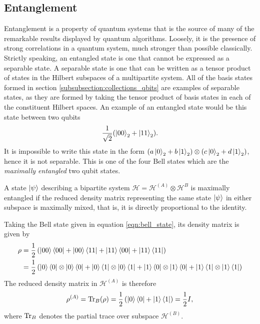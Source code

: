 \subsection{Entanglement}
Entanglement is a property of quantum systems that is the source of many of the remarkable results displayed by quantum algorithms.
Loosely, it is the presence of strong correlations in a quantum system, much stronger than possible classically.
Strictly speaking, an entangled state is one that cannot be expressed as a separable state.
A separable state is one that can be written as a tensor product of states in the Hilbert subspaces of a multipartite system.
All of the basis states formed in section \ref{subsubsection:collections_qbits} are examples of separable states, as they are formed by taking the tensor product of basis states in each of the constituent Hilbert spaces.
An example of an entangled state would be this state between two qubits
\begin{equation}
    \label{eqn:bell_state}
    \frac{1}{\sqrt{2}}(\ket{00}_2 + \ket{11}_2).
\end{equation}
It is impossible to write this state in the form $\left(a\ket{0}_2 + b\ket{1}_2\right) \otimes \left(c\ket{0}_2 + d\ket{1}_2 \right)$, hence it is not separable.
This is one of the four Bell states which are the \emph{maximally entangled} two qubit states.
\begin{definition}
    A state $\ket{\psi}$ describing a bipartite system $\mathcal{H} = \mathcal{H}^{(A)} \otimes \mathcal{H}^{B}$ is maximally entangled if the reduced density matrix representing the same state $\ket{\psi}$ in either subspace is maximally mixed, that is, it is directly proportional to the identity.
\end{definition}
Taking the Bell state given in equation \ref{eqn:bell_state}, its density matrix is given by
\begin{align}
    \rho &= \frac{1}{2}\left(\ket{00}\bra{00} + \ket{00}\bra{11} + \ket{11}\bra{00} + \ket{11}\bra{11}\right)\\
    &= \frac{1}{2}\left(\ket{0}\bra{0}\otimes\ket{0}\bra{0} + \ket{0}\bra{1}\otimes\ket{0}\bra{1} + \ket{1}\bra{0}\otimes\ket{1}\bra{0} + \ket{1}\bra{1}\otimes\ket{1}\bra{1}\right)
\end{align}
The reduced density matrix in $\mathcal{H}^{(A)}$ is therefore
\begin{equation}
    \rho^{(A)} = \operatorname{Tr}_B(\rho) = \frac{1}{2}\left(\ket{0}\bra{0} + \ket{1}\bra{1}\right) = \frac{1}{2}I,
\end{equation}
where $\operatorname{Tr}_B$ denotes the partial trace over subspace $\mathcal{H}^{(B)}$.

